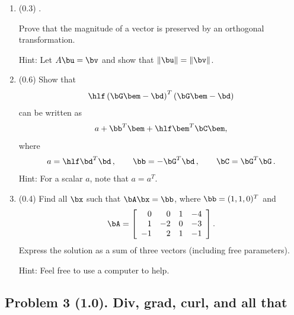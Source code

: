 \documentclass[11pt,titlepage,fleqn]{article}
\begin{document}
\begin{enumerate}
\begin{enumerate}
\end{enumerate}


\item (0.3) \citep[][p.~473, P10]{SteinWysession}.

Prove that the magnitude of a vector is preserved by an orthogonal transformation.

Hint: Let $A\bu = \bv$ and show that $\|\bu\| = \|\bv\|$.


\item (0.6) Show that 
%
\begin{eqnarray}
\hlf \left(\bG\bem - \bd \right)^T \left(\bG\bem - \bd\right)
\end{eqnarray}
%
can be written as 
%
\begin{eqnarray}
a + \bb^T\bem + \hlf \bem^T\bC\bem,
\end{eqnarray}
%
where
%
\begin{equation}
a = \hlf\bd^T\bd
\,,\hspace{20pt}
\bb = -\bG^T\bd
\,,\hspace{20pt}
\bC = \bG^T\bG
\,.
\end{equation}
%
Hint: For a scalar $a$, note that $a = a^T$.


\item (0.4) Find all $\bx$ such that $\bA\bx = \bb$, where $\bb = (1, 1, 0)^T$ and
%
\begin{eqnarray*}
\bA =  \left[ \begin{array}{rrrr}
     0  &   0  &   1 & -4 \\
     1  &   -2  &   0 & -3 \\
     -1  &   2  &   1 & -1 \\
\end{array} \right].
\end{eqnarray*}
%
Express the solution as a sum of three vectors (including free parameters).

Hint: Feel free to use a computer to help.

\end{enumerate}


\pagebreak
\subsection*{Problem 3 (1.0). Div, grad, curl, and all that}
\end{document}
